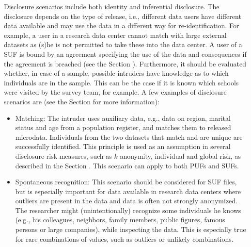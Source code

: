 \documentclass[letterpaper,10pt,english]{sphinxmanual}
\begin{document}
Disclosure scenarios include both identity and inferential disclosure.
The disclosure depends on the type of release, i.e., different data
users have different data available and may use the data in a different
way for re-identification. For example, a user in a research data center
cannot match with large external datasets as (s)he is not permitted to
take these into the data center. A user of a SUF is bound by an
agreement specifying the use of the data and consequences if the
agreement is breached (see the Section 
). Furthermore, it should be
evaluated whether, in case of a sample, possible intruders have
knowledge as to which individuals are in the sample. This can be the
case if it is known which schools were visited by the survey team, for
example. A few examples of disclosure scenarios are (see the Section
 for
more information):
\begin{itemize}
\item {} 
Matching: The intruder uses auxiliary data, e.g., data on region,
marital status and age from a population register, and matches them
to released microdata. Individuals from the two datasets that match
and are unique are successfully identified. This principle is used as
an assumption in several disclosure risk measures, such as
\(k\)-anonymity, individual and global risk, as described in
the Section .
This scenario can apply to both PUFs and SUFs.

\item {} 
Spontaneous recognition: This scenario should be considered for SUF
files, but is especially important for data available in research
data centers where outliers are present in the data and data is often
not strongly anonymized. The researcher might (unintentionally)
recognize some individuals he knows (e.g., his colleagues, neighbors,
family members, public figures, famous persons or large companies),
while inspecting the data. This is especially true for rare
combinations of values, such as outliers or unlikely combinations.

\end{itemize}
\end{document}
